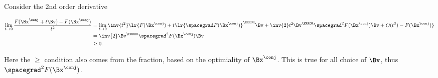Consider the 2nd order derivative

\begin{dmath}\label{eqn:convexOptimizationLecture7:760}
\begin{aligned}
\lim_{t \rightarrow 0} \frac{ F(\Bx^\conj + t \Bv) - F(\Bx^\conj)}{t^2}
&=
\lim_{t \rightarrow 0} \inv{t^2}
\lr{
F(\Bx^\conj) + t \lr{ \spacegrad F(\Bx^\conj) }^\T \Bv + \inv{2} t^2 \Bv^\T \spacegrad^2 F(\Bx^\conj) \Bv + O(t^3)
- F(\Bx^\conj)
} \\
&=
\inv{2} \Bv^\T \spacegrad^2 F(\Bx^\conj) \Bv \\
&\ge 0.
\end{aligned}
\end{dmath}

Here the \( \ge \) condition also comes from the fraction, based on the optimiality of \( \Bx^\conj \).  This is true for all choice of \( \Bv \), thus \( \spacegrad^2 F(\Bx^\conj) \).

\EndArticle
